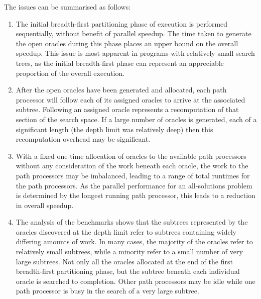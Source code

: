 The issues can be summarised as follows:
\begin{enumerate}
\item{The initial breadth-first partitioning phase of execution is performed sequentially,
  without benefit of parallel speedup.  The time taken to generate the open oracles
  during this phase places an upper bound on the overall speedup.  This issue is most
  apparent in programs with relatively small search trees, as the initial breadth-first
  phase can represent an appreciable proportion of the overall execution.}
\item{After the open oracles have been generated and allocated, each path processor will
  follow each of its assigned oracles to arrive at the associated subtree.  Following
  an assigned oracle represents a recomputation of that section of the search space.  If
  a large number of oracles is generated, each of a significant length (the depth limit
  was relatively deep) then this recomputation overhead may be significant.}
\item{With a fixed one-time allocation of oracles to the available path processors without
  any consideration of the work beneath each oracle, the work to the path processors may
  be imbalanced, leading to a range of total runtimes for the path processors.  As the
  parallel performance for an all-solutions problem is determined by the longest running
  path processor, this leads to a reduction in overall speedup.}
\item{The analysis of the benchmarks shows that the subtrees represented by
  the oracles discovered at the depth limit refer to subtrees containing widely differing
  amounts of work.  In many cases, the majority of the oracles refer to relatively small
  subtrees, while a minority refer to a small number of very large subtrees.  Not only
  all the oracles allocated at the end of the first breadth-first partitioning phase, but
  the subtree beneath each individual oracle is searched to completion.  Other path
  processors may be idle while one path processor is busy in the search of a very large
  subtree.}
\end{enumerate}

